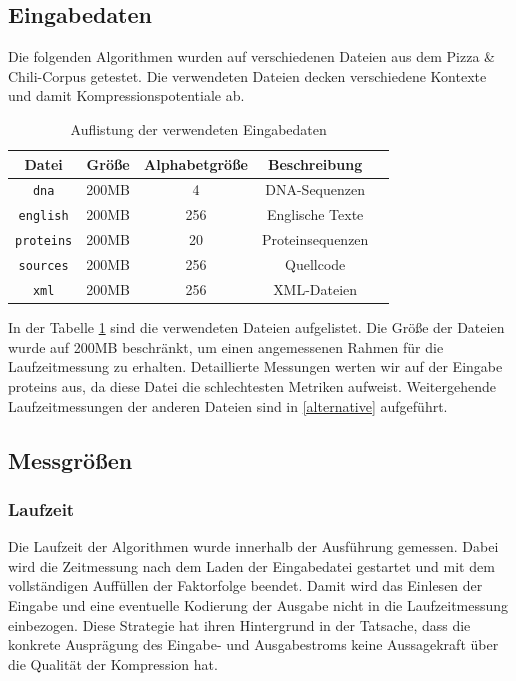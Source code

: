 \subsection{Eingabedaten}
Die folgenden Algorithmen wurden auf verschiedenen Dateien aus dem Pizza \& Chili-Corpus getestet. Die verwendeten Dateien decken verschiedene Kontexte und damit
Kompressionspotentiale ab.
\begin{table}[ht]
    \centering
    \caption{Auflistung der verwendeten Eingabedaten}
    \label{inputdata}
    \begin{tabular}{|c|c|c|c|c|}
        \hline
        \textbf{Datei} & \textbf{Größe} & \textbf{Alphabetgröße} & \textbf{Beschreibung} \\
        \hline
        \texttt{dna} & 200MB & 4 & DNA-Sequenzen \\
        \hline
        \texttt{english} & 200MB & 256 & Englische Texte \\
        \hline
        \texttt{proteins} & 200MB & 20 & Proteinsequenzen \\
        \hline
        \texttt{sources} & 200MB & 256 & Quellcode \\
        \hline
        \texttt{xml} & 200MB & 256 & XML-Dateien \\
        \hline
    \end{tabular}
\end{table}
In der Tabelle \ref{inputdata} sind die verwendeten Dateien aufgelistet. Die Größe der Dateien wurde auf 200MB beschränkt, um einen angemessenen Rahmen für die 
Laufzeitmessung zu erhalten. Detaillierte Messungen werten wir auf der Eingabe proteins aus, da diese Datei die schlechtesten Metriken aufweist. Weitergehende
Laufzeitmessungen der anderen Dateien sind in \ref{alternative} aufgeführt.

\subsection{Messgrößen}

\subsubsection{Laufzeit}
Die Laufzeit der Algorithmen wurde innerhalb der Ausführung gemessen. Dabei wird die Zeitmessung nach dem Laden der Eingabedatei gestartet und mit dem vollständigen
Auffüllen der Faktorfolge beendet. Damit wird das Einlesen der Eingabe und eine eventuelle Kodierung der Ausgabe nicht in die Laufzeitmessung einbezogen. Diese Strategie
hat ihren Hintergrund in der Tatsache, dass die konkrete Ausprägung des Eingabe- und Ausgabestroms keine Aussagekraft über die Qualität der Kompression hat.

